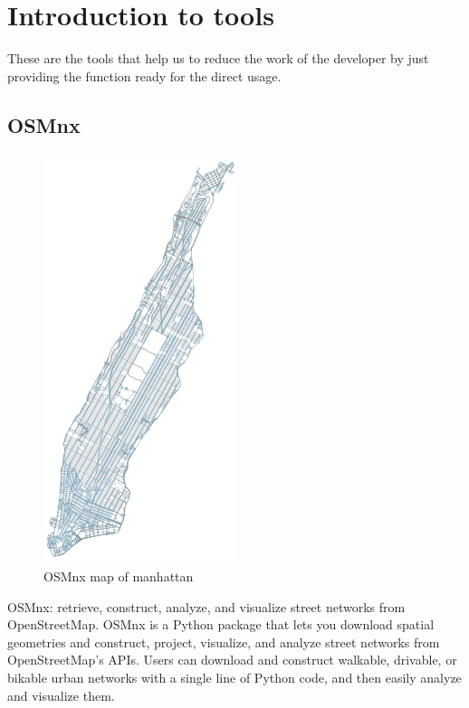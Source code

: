 \section{Introduction to tools}
These are the tools that help us to reduce the work of the developer by just providing the function ready for the direct usage.

\subsection{OSMnx}

\begin{figure}[h]
\centering \includegraphics[scale=0.50]{input/images/osmnx.png}
\caption{OSMnx map of manhattan}
\end{figure}
OSMnx: retrieve, construct, analyze, and visualize street networks from OpenStreetMap. OSMnx is a Python package that lets you download spatial geometries and construct, project, visualize, and analyze street networks from OpenStreetMap’s APIs. Users can download and construct walkable, drivable, or bikable urban networks with a single line of Python code, and then easily analyze and visualize them.\\

